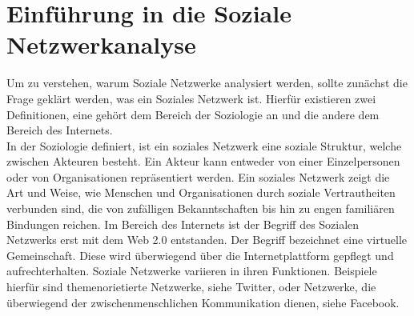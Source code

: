 \chapter{Einführung in die Soziale Netzwerkanalyse}\label{ch:examples}
Um zu verstehen, warum Soziale Netzwerke analysiert werden, sollte zunächst die Frage geklärt werden, was ein Soziales Netzwerk ist. Hierfür existieren zwei Definitionen, eine gehört dem Bereich der Soziologie an und die andere dem Bereich des Internets. \\
In der Soziologie definiert, ist ein soziales Netzwerk eine soziale Struktur, welche zwischen Akteuren besteht. Ein Akteur kann entweder von einer Einzelpersonen oder  von Organisationen repräsentiert werden. Ein soziales Netzwerk zeigt die Art und Weise, wie Menschen und Organisationen durch soziale Vertrautheiten verbunden sind, die von zufälligen Bekanntschaften bis hin zu engen familiären Bindungen reichen. Im Bereich des Internets ist der Begriff des Sozialen Netzwerks erst mit dem Web 2.0 entstanden. Der Begriff bezeichnet eine virtuelle Gemeinschaft. Diese wird überwiegend über die Internetplattform gepflegt und aufrechterhalten. Soziale Netzwerke variieren in ihren Funktionen. Beispiele hierfür sind themenorietierte Netzwerke, siehe Twitter, oder Netzwerke, die überwiegend der zwischenmenschlichen Kommunikation dienen, siehe Facebook.

